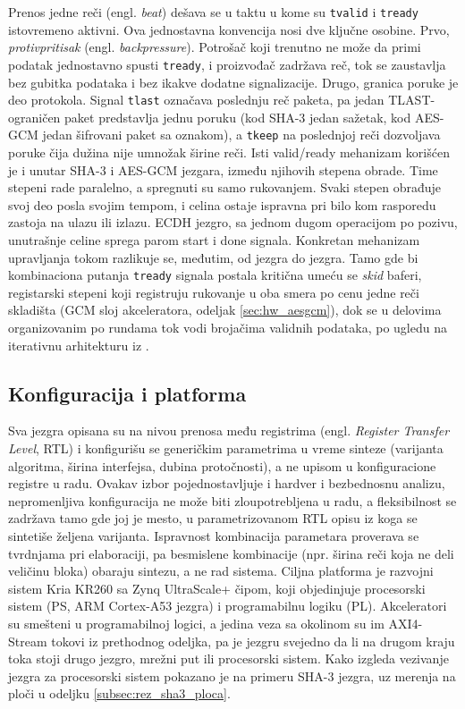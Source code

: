 Prenos jedne reči (engl. \textit{beat}) dešava se u taktu u kome su \texttt{tvalid} i \texttt{tready} istovremeno aktivni. Ova jednostavna konvencija nosi dve ključne osobine. Prvo, \textit{protivpritisak} (engl. \textit{backpressure}). Potrošač koji trenutno ne može da primi podatak jednostavno spusti \texttt{tready}, i proizvođač zadržava reč, tok se zaustavlja bez gubitka podataka i bez ikakve dodatne signalizacije. Drugo, granica poruke je deo protokola. Signal \texttt{tlast} označava poslednju reč paketa, pa jedan TLAST-ograničen paket predstavlja jednu poruku (kod SHA-3 jedan sažetak, kod AES-GCM jedan šifrovani paket sa oznakom), a \texttt{tkeep} na poslednjoj reči dozvoljava poruke čija dužina nije umnožak širine reči.
\smallbreak
Isti valid/ready mehanizam korišćen je i unutar SHA-3 i AES-GCM jezgara, između njihovih stepena obrade. Time stepeni rade paralelno, a spregnuti su samo rukovanjem. Svaki stepen obrađuje svoj deo posla svojim tempom, i celina ostaje ispravna pri bilo kom rasporedu zastoja na ulazu ili izlazu. ECDH jezgro, sa jednom dugom operacijom po pozivu, unutrašnje celine sprega parom start i done signala. Konkretan mehanizam upravljanja tokom razlikuje se, međutim, od jezgra do jezgra. Tamo gde bi kombinaciona putanja \texttt{tready} signala postala kritična umeću se \textit{skid} baferi, registarski stepeni koji registruju rukovanje u oba smera po cenu jedne reči skladišta (GCM sloj akceleratora, odeljak \ref{sec:hw_aesgcm}), dok se u delovima organizovanim po rundama tok vodi brojačima validnih podataka, po ugledu na iterativnu arhitekturu iz \cite{gavrilovic_diplomski}.

\subsection{Konfiguracija i platforma}
\label{subsec:hw_platforma}

Sva jezgra opisana su na nivou prenosa među registrima (engl. \textit{Register Transfer Level}, RTL) i konfigurišu se generičkim parametrima u vreme sinteze (varijanta algoritma, širina interfejsa, dubina protočnosti), a ne upisom u konfiguracione registre u radu. Ovakav izbor pojednostavljuje i hardver i bezbednosnu analizu, nepromenljiva konfiguracija ne može biti zloupotrebljena u radu, a fleksibilnost se zadržava tamo gde joj je mesto, u parametrizovanom RTL opisu iz koga se sintetiše željena varijanta. Ispravnost kombinacija parametara proverava se tvrdnjama pri elaboraciji, pa besmislene kombinacije (npr. širina reči koja ne deli veličinu bloka) obaraju sintezu, a ne rad sistema.
\smallbreak
Ciljna platforma je razvojni sistem Kria KR260 sa Zynq UltraScale+ čipom, koji objedinjuje procesorski sistem (PS, ARM Cortex-A53 jezgra) i programabilnu logiku (PL). Akceleratori su smešteni u programabilnoj logici, a jedina veza sa okolinom su im AXI4-Stream tokovi iz prethodnog odeljka, pa je jezgru svejedno da li na drugom kraju toka stoji drugo jezgro, mrežni put ili procesorski sistem. Kako izgleda vezivanje jezgra za procesorski sistem pokazano je na primeru SHA-3 jezgra, uz merenja na ploči u odeljku \ref{subsec:rez_sha3_ploca}.

